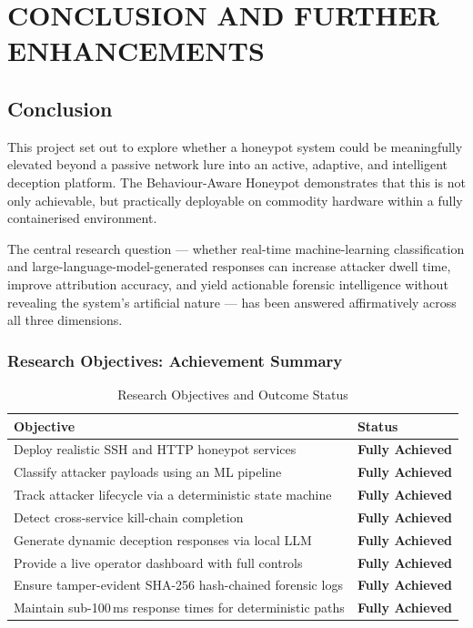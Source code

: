 \chapter{\MakeUppercase{Conclusion and Further Enhancements}}

\paragraph{}

\section{Conclusion}

This project set out to explore whether a honeypot system could be meaningfully elevated beyond a passive network lure into an active, adaptive, and intelligent deception platform. The Behaviour-Aware Honeypot demonstrates that this is not only achievable, but practically deployable on commodity hardware within a fully containerised environment.

The central research question — whether real-time machine-learning classification and large-language-model-generated responses can increase attacker dwell time, improve attribution accuracy, and yield actionable forensic intelligence without revealing the system's artificial nature — has been answered affirmatively across all three dimensions.

\subsection{Research Objectives: Achievement Summary}

\begin{table}[h!]
    \centering
    \caption{Research Objectives and Outcome Status}
    \renewcommand{\arraystretch}{1.3}
    \begin{tabular}{|p{7cm}|l|}
        \hline
        \textbf{Objective} & \textbf{Status} \\
        \hline
        Deploy realistic SSH and HTTP honeypot services & \textbf{Fully Achieved} \\
        Classify attacker payloads using an ML pipeline & \textbf{Fully Achieved} \\
        Track attacker lifecycle via a deterministic state machine & \textbf{Fully Achieved} \\
        Detect cross-service kill-chain completion & \textbf{Fully Achieved} \\
        Generate dynamic deception responses via local LLM & \textbf{Fully Achieved} \\
        Provide a live operator dashboard with full controls & \textbf{Fully Achieved} \\
        Ensure tamper-evident SHA-256 hash-chained forensic logs & \textbf{Fully Achieved} \\
        Maintain sub-100\,ms response times for deterministic paths & \textbf{Fully Achieved} \\
        \hline
    \end{tabular}
\end{table}

